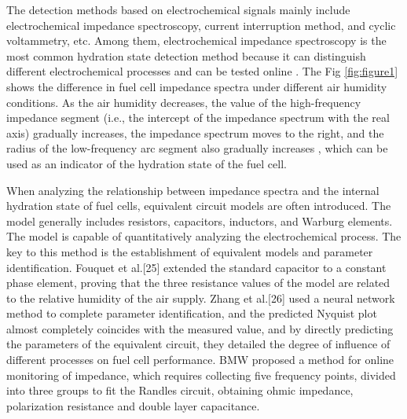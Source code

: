 The detection methods based on electrochemical signals mainly include electrochemical impedance spectroscopy, current interruption method, and cyclic voltammetry, etc. Among them, electrochemical impedance spectroscopy is the most common hydration state detection method because it can distinguish different electrochemical processes and can be tested online \cite{yousfisteinerDiagnosisPolymerElectrolyte2011,chenOperationCharacteristicsCarbon2015}. The Fig \ref{fig:figure1} shows the difference in fuel cell impedance spectra under different air humidity conditions. As the air humidity decreases, the value of the high-frequency impedance segment (i.e., the intercept of the impedance spectrum with the real axis) gradually increases, the impedance spectrum moves to the right, and the radius of the low-frequency arc segment also gradually increases \cite{hussainiVisualizationQuantificationCathode2009,mocoteguy_study_2020,laribi_impedance_2016}, which can be used as an indicator of the hydration state of the fuel cell.
\par
When analyzing the relationship between impedance spectra and the internal hydration state of fuel cells, equivalent circuit models are often introduced. The model generally includes resistors, capacitors, inductors, and Warburg elements\cite{tangRecentProgressUse2020}. The model is capable of quantitatively analyzing the electrochemical process.  The key to this method is the establishment of equivalent models and parameter identification. Fouquet et al.[25] extended the standard capacitor to a constant phase element, proving that the three resistance values of the model are related to the relative humidity of the air supply. Zhang et al.[26] used a neural network method to complete parameter identification, and the predicted Nyquist plot almost completely coincides with the measured value, and by directly predicting the parameters of the equivalent circuit, they detailed the degree of influence of different processes on fuel cell performance. BMW proposed a method for online monitoring of impedance, which requires collecting five frequency points, divided into three groups to fit the Randles circuit, obtaining ohmic impedance, polarization resistance and double layer capacitance\cite{fouquetModelBasedPEM2006}.
